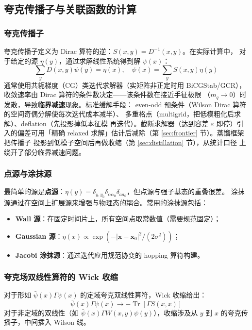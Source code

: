 \documentclass[11pt,a4paper]{ctexart}
\newcommand{\eps}{\varepsilon}
\newcommand{\tr}{\operatorname{Tr}}
\begin{document}
\subsection{夸克传播子与关联函数的计算}

\subsubsection{夸克传播子}

夸克传播子定义为 Dirac 算符的逆：$S(x,y) = D^{-1}(x,y)$。在实际计算中，
对于给定的源 $\eta(y)$，通过求解线性系统得到解 $\psi(x)$：
\begin{equation}
\sum_y D(x,y) \psi(y) = \eta(x), \quad
\psi(x) = \sum_y S(x,y) \eta(y)
\end{equation}
通常使用共轭梯度（CG）类迭代求解器（实矩阵非正定时用 BiCGStab/GCR），
收敛速率由 Dirac 算符的条件数决定——该条件数在接近手征极限
（$m_q \to 0$）时发散，导致\textbf{临界减速}现象。标准缓解手段：
even-odd 预条件（Wilson Dirac 算符的空间奇偶分解使每次迭代成本减半）、
多重格点（multigrid，把低模粗化后求解）、deflation（先投影掉低本征模
再迭代）。截断求解器（达到容差 $\eps$ 即停）引入的偏差可用「精确
relaxed 求解」估计后减除（第 \ref{sec:frontier} 节）。蒸馏框架把传播子
投影到低模子空间后再做收缩（第 \ref{sec:distillation} 节），从统计口径
上绕开了部分临界减速问题。

\subsubsection{点源与涂抹源}

最简单的源是\textbf{点源}：$\eta(y) = \delta_{y,y_0}
\delta_{\alpha\alpha_0} \delta_{aa_0}$，但点源与强子基态的重叠很差。
涂抹源通过在空间上扩展源来增强与物理态的耦合。常用的涂抹源包括：
\begin{itemize}
  \item \textbf{Wall 源}：在固定时间片上，所有空间点取常数值（需要规范固定）；
  \item \textbf{Gaussian 源}：$\eta(x) \propto \exp(-|\mathbf{x} - \mathbf{x}_0|^2
  / (2\sigma^2))$；
  \item \textbf{Jacobi 涂抹源}：通过迭代应用规范协变的 hopping 算符构建。
\end{itemize}

\subsubsection{夸克场双线性算符的 Wick 收缩}

对于形如 $\bar{\psi}(x) \Gamma \psi(x)$ 的定域夸克双线性算符，Wick 收缩给出：
\begin{equation}
\bar{\psi}(x) \Gamma \psi(x) \to -\tr[\Gamma S(x,x)]
\end{equation}
对于非定域的双线性（如 $\bar{\psi}(x) \Gamma W(x,y) \psi(y)$），收缩涉及从
$y$ 到 $x$ 的夸克传播子，中间插入 Wilson 线。
\end{document}
